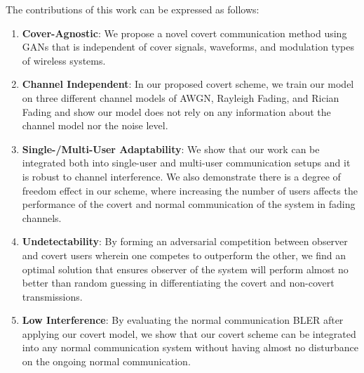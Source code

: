 The contributions of this work can be expressed as follows:
\begin{enumerate}
	\item \textbf{Cover-Agnostic}: We propose a novel covert communication method using GANs that is independent of cover signals, waveforms, and modulation types of wireless systems.
	\item \textbf{Channel Independent}: In our proposed covert scheme, we train our model on three different channel models of AWGN, Rayleigh Fading, and Rician Fading and show our model does not rely on any information about the channel model nor the noise level.
	\item \textbf{Single-/Multi-User Adaptability}: We show that our work can be integrated both into single-user and multi-user communication setups and it is robust to channel interference. We also demonstrate there is a degree of freedom effect in our scheme, where increasing the number of users affects the performance of the covert and normal communication of the system in fading channels.
	\item \textbf{Undetectability}: By forming an adversarial competition between observer and covert users wherein one competes to outperform the other, we find an optimal solution that ensures observer of the system will perform almost no better than random guessing in differentiating the covert and non-covert transmissions.
	\item \textbf{Low Interference}: By evaluating the normal communication BLER after applying our covert model, we show that our covert scheme can be integrated into any normal communication system without having almost no disturbance on the ongoing normal communication.
\end{enumerate}
